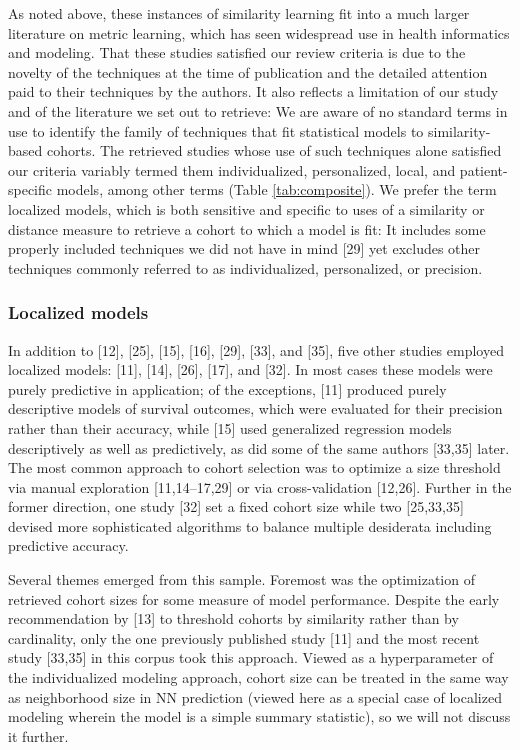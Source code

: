 \documentclass[preprint, 3p,
authoryear]{elsarticle} %
\begin{document}
As noted above, these instances of similarity learning fit into a much
larger literature on metric learning, which has seen widespread use in
health informatics and modeling. That these studies satisfied our review
criteria is due to the novelty of the techniques at the time of
publication and the detailed attention paid to their techniques by the
authors. It also reflects a limitation of our study and of the
literature we set out to retrieve: We are aware of no standard terms in
use to identify the family of techniques that fit statistical models to
similarity-based cohorts. The retrieved studies whose use of such
techniques alone satisfied our criteria variably termed them
individualized, personalized, local, and patient-specific models, among
other terms (Table \ref{tab:composite}). We prefer the term localized
models, which is both sensitive and specific to uses of a similarity or
distance measure to retrieve a cohort to which a model is fit: It
includes some properly included techniques we did not have in mind
{[}29{]} yet excludes other techniques commonly referred to as
individualized, personalized, or precision.

\hypertarget{localized-models}{%
\subsubsection{Localized models}\label{localized-models}}

In addition to {[}12{]}, {[}25{]}, {[}15{]}, {[}16{]}, {[}29{]},
{[}33{]}, and {[}35{]}, five other studies employed localized models:
{[}11{]}, {[}14{]}, {[}26{]}, {[}17{]}, and {[}32{]}. In most cases
these models were purely predictive in application; of the exceptions,
{[}11{]} produced purely descriptive models of survival outcomes, which
were evaluated for their precision rather than their accuracy, while
{[}15{]} used generalized regression models descriptively as well as
predictively, as did some of the same authors {[}33,35{]} later. The
most common approach to cohort selection was to optimize a size
threshold via manual exploration {[}11,14--17,29{]} or via
cross-validation {[}12,26{]}. Further in the former direction, one study
{[}32{]} set a fixed cohort size while two {[}25,33,35{]} devised more
sophisticated algorithms to balance multiple desiderata including
predictive accuracy.

Several themes emerged from this sample. Foremost was the optimization
of retrieved cohort sizes for some measure of model performance. Despite
the early recommendation by {[}13{]} to threshold cohorts by similarity
rather than by cardinality, only the one previously published study
{[}11{]} and the most recent study {[}33,35{]} in this corpus took this
approach. Viewed as a hyperparameter of the individualized modeling
approach, cohort size can be treated in the same way as neighborhood
size in NN prediction (viewed here as a special case of localized
modeling wherein the model is a simple summary statistic), so we will
not discuss it further.
\end{document}
